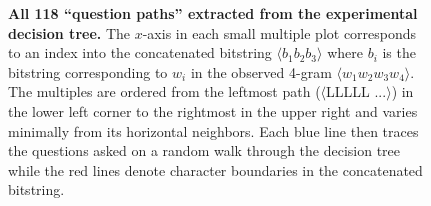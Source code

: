 \documentclass[12pt]{article}
\begin{document}
\begin{figure}
  \centering
  \vspace{-1in}
  \caption{\textbf{All 118 ``question paths'' extracted from the
      experimental decision tree.} The $x$-axis in each small multiple
    plot corresponds to an index into the concatenated bitstring
    $\langle b_1 b_2 b_3 \rangle$ where $b_i$ is the bitstring
    corresponding to $w_i$ in the observed 4-gram $\langle w_1 w_2 w_3
    w_4 \rangle$. The multiples are ordered from the leftmost path
    ($\langle$LLLLL $...\rangle$) in the lower left corner to the
    rightmost in the upper right and varies minimally from its
    horizontal neighbors. Each blue line then traces the questions
    asked on a random walk through the decision tree while the red
    lines denote character boundaries in the concatenated bitstring.}
  \label{fig:bs_examplepaths}
\end{figure}

\end{document}
